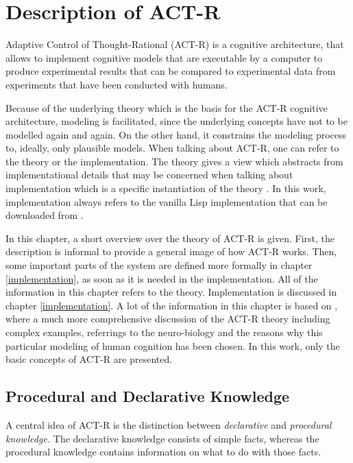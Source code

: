 \chapter{Description of ACT-R}
\label{actr_description}

Adaptive Control of Thought-Rational  (ACT-R) is a cognitive architecture, that allows to implement cognitive models that are executable by a computer to produce experimental results that can be compared to experimental data from experiments that have been conducted with humans.

Because of the underlying theory which is the basis for the ACT-R cognitive architecture, modeling is facilitated, since the underlying concepts have not to be modelled again and again. On the other hand, it constrains the modeling process to, ideally, only plausible models. When talking about ACT-R, one can refer to the theory or the implementation. The theory gives a view which abstracts from implementational details that may be concerned when talking about implementation which is a specific instantiation of the theory \cite[unit 1, p. 1]{actr_tutorial}. In this work, implementation always refers to the vanilla Lisp implementation that can be downloaded from \cite{actr_homepage}.

In this chapter, a short overview over the theory of ACT-R is given. First, the description is informal to provide a general image of how ACT-R works. Then, some important parts of the system are defined more formally in chapter \ref{implementation}, as soon as it is needed in the implementation. All of the information in this chapter refers to the theory. Implementation is discussed in chapter \ref{implementation}. A lot of the information in this chapter is based on \cite{anderson_how_2007, anderson_integrated_2004, taatgen_modeling_2006}, where a much more comprehensive discussion of the ACT-R theory including complex examples, referrings to the neuro-biology and the reasons why this particular modeling of human cognition has been chosen. In this work, only the basic concepts of ACT-R are presented.

\section{Procedural and Declarative Knowledge}

A central idea of ACT-R is the distinction between \emph{declarative} and \emph{procedural knowledge.} The declarative knowledge consists of simple facts, whereas the procedural knowledge contains information on what to do with those facts.

